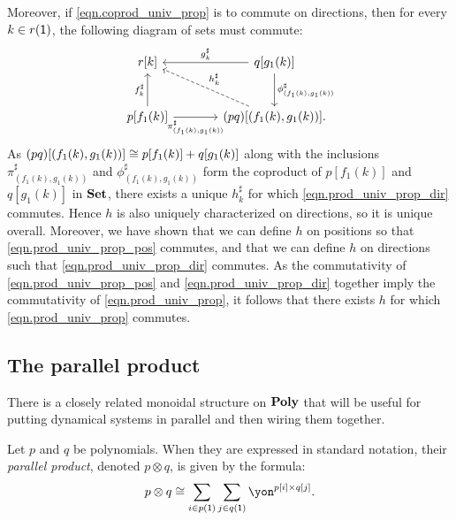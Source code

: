 \documentclass[Book-Poly]{subfiles}
\begin{document}
\begin{exercise}
\begin{solution}
Moreover, if \eqref{eqn.coprod_univ_prop} is to commute on directions, then for every $k \in r(\textsf{1})$, the following diagram of sets must commute:
\begin{equation} \label{eqn.prod_univ_prop_dir}
\begin{tikzcd}[sep=large]
	r[k] & q[g_1(k)] \ar[l, "g^\sharp_k"'] \ar[d, "\phi^\sharp_{(f_1(k), g_1(k))}"] \\
	p[f_1(k)] \ar[u, "f^\sharp_k"] \ar[r, "\pi^\sharp_{(f_1(k), g_1(k))}"'] & (pq)[(f_1(k), g_1(k))]. \ar[ul, "h^\sharp_k"', dashed] 
\end{tikzcd}
\end{equation}
As $(pq)[(f_1(k), g_1(k))] \cong p[f_1(k)] + q[g_1(k)]$ along with the inclusions $\pi^\sharp_{(f_1(k), g_1(k))}$ and $\phi^\sharp_{(f_1(k), g_1(k))}$ form the coproduct of $p[f_1(k)]$ and $q[g_1(k)]$ in $\mathbf{Set}$, there exists a unique $h^\sharp_k$ for which \eqref{eqn.prod_univ_prop_dir} commutes.
Hence $h$ is also uniquely characterized on directions, so it is unique overall.
Moreover, we have shown that we can define $h$ on positions so that \eqref{eqn.prod_univ_prop_pos} commutes, and that we can define $h$ on directions such that \eqref{eqn.prod_univ_prop_dir} commutes.
As the commutativity of \eqref{eqn.prod_univ_prop_pos} and \eqref{eqn.prod_univ_prop_dir} together imply the commutativity of \eqref{eqn.prod_univ_prop}, it follows that there exists $h$ for which \eqref{eqn.prod_univ_prop} commutes.
\end{solution}
\end{exercise}

\subsection{The parallel product} \label{subsec.poly.func_nat.prepare_dyn.par}
There is a closely related monoidal structure on $\mathbf{Poly}$ that will be useful for putting dynamical systems in parallel and then wiring them together.

\begin{definition}\label{def.dirichlet}
Let $p$ and $q$ be polynomials. When they are expressed in standard notation, their \emph{parallel product}, denoted $p\otimes q$, is given by the formula:
\begin{equation}\label{eqn.parallel_def}
p\otimes q\cong\sum_{i\in p(\1)}\sum_{j\in q(\1)}\yon^{p[i]\times q[j]}.
\end{equation}
\end{definition}
\end{document}
